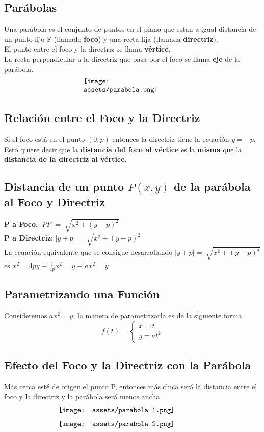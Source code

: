 \documentclass[10pt,a4paper]{article}
\begin{document}
\subsection*{Parábolas}
Una parábola es el conjunto de puntos en el plano que estan a igual distancia de un punto fijo F (llamado \textbf{foco}) y una recta fija (llamada \textbf{directriz}). \\
El punto entre el foco y la directriz se llama \textbf{vértice}. \\
La recta perpendicular a la directriz que pasa por el foco se llama \textbf{eje} de la parábola.
\[\begin{minipage}[b]{0.4\textwidth}
    \texttt{[image: assets/parabola.png]}
\end{minipage}\]
\subsection*{Relación entre el Foco y la Directriz}
Si el foco está en el punto $(0, p)$ entonces la directriz tiene la ecuación $y = -p$. 
Esto quiere decir que la \textbf{distancia del foco al vértice} es la \textbf{misma} que la \textbf{distancia de la directriz al vértice.}
\subsection*{Distancia de un punto $P(x, y)$ de la parábola al Foco y Directriz}
\textbf{P a Foco}: $|PF| = \sqrt[]{x^{2} + (y-p)^{2}}$ \\
\textbf{P a Directriz}: $ |y+p| = \sqrt[]{x^{2} + (y-p)^{2}} $ \\
La ecuación equivalente que se consigue desarrollando $ |y+p| = \sqrt[]{x^{2} + (y-p)^{2}} $ es $x^{2} = 4py \equiv \frac{1}{4p} x^{2} = y \equiv ax^{2} = y  $
\subsection*{Parametrizando una Función}
Consideremos $ax^{2} = y$, la manera de parametrizarla es de la siguiente forma 
\[
f(t) =
\begin{cases} 
x = t \\
y = at^{2}
\end{cases}
\]
\subsection*{Efecto del Foco y la Directriz con la Parábola}
Más cerca esté de origen el punto P, entonces más chica será la distancia entre el foco y la directriz y la parábola será menos ancha. 
\[\begin{minipage}[b]{0.6\textwidth}
    \texttt{[image: assets/parabola\_1.png]}
\end{minipage}\]
\[\begin{minipage}[b]{0.6\textwidth}
    \texttt{[image: assets/parabola\_2.png]}
\end{minipage}\]
\end{document}
